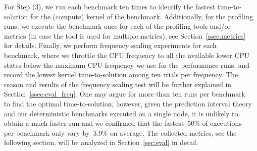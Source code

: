 %
For Step (3), we run each benchmark ten times to identify the fastest time-to-solution for the
(compute) kernel of the benchmark. Additionally, for the profiling runs, we execute the benchmark
once for each of the profiling tools and/or metrics (in case the tool is used for multiple metrics),
see Section~\ref{ssec:metrics} for details. Finally, we perform frequency scaling experiments
for each benchmark, where we throttle the CPU frequency to all the available lower CPU states
below the maximum CPU frequency we use for the performance runs, and record the lowest kernel
time-to-solution among ten trials per frequency. The reason and results of the frequency scaling
test will be further explained in Section~\ref{ssec:eval_freq}.
One may argue for more than ten runs per benchmark to find the optimal time-to-solution, however,
given the prediction interval theory and our deterministic benchmarks executed on a single node,
it is unlikely to obtain a much faster run and we confirmed that the fastest~50\% of executions per
benchmark only vary by~3.9\% on average.
%
The collected metrics, see the following section, will be analyzed in Section~\ref{sec:eval} in detail.

